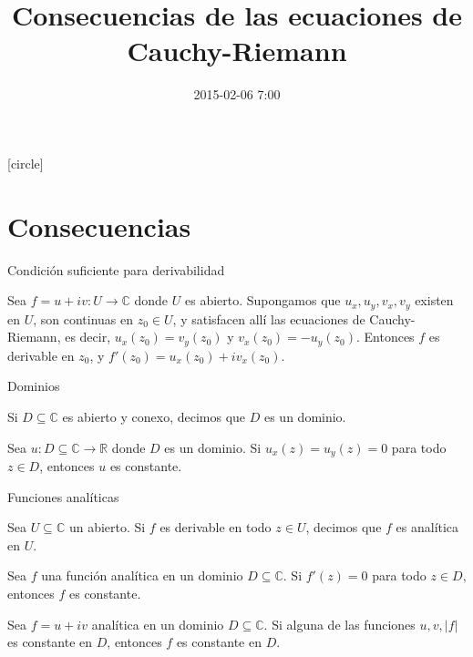 \documentclass[spanish,presentation]{beamer}
\date{2015-02-06 7:00}
\title{Consecuencias de las ecuaciones de Cauchy-Riemann}
\begin{document}
\maketitle
{}
[circle]

\tableofcontents

\section{Consecuencias}
\label{sec-1}

\begin{frame}[label=sec-1-1]{Condición suficiente para derivabilidad}
\begin{theorem}
Sea \(f=u+iv\colon U\to \mathbb{C}\) donde \(U\) es
abierto. Supongamos que \(u_{x},u_{y},v_{x},v_{y}\) existen en
\(U\), son continuas en \(z_{0}\in U\), y satisfacen allí las
ecuaciones de Cauchy-Riemann, es decir,
\(u_{x}(z_{0})=v_{y}(z_{0})\) y
\(v_{x}(z_{0})=-u_{y}(z_{0})\). Entonces \(f\) es derivable en
\(z_{0}\), y \(f'(z_{0})=u_{x}(z_{0})+iv_{x}(z_{0})\).
\end{theorem}
\end{frame}

\begin{frame}[label=sec-1-2]{Dominios}
\begin{definition}
Si \(D\subseteq \mathbb{C}\) es abierto y conexo, decimos que
\(D\) es un \alert{dominio}.
\end{definition}

\begin{lemma}
Sea \(u\colon D\subseteq \mathbb{C}\to \mathbb{R}\) donde \(D\) es
un dominio. Si \(u_{x}(z)=u_{y}(z)=0\) para todo \(z\in D\),
entonces \(u\) es constante.
\end{lemma}
\end{frame}

\begin{frame}[label=sec-1-3]{Funciones analíticas}
\begin{definition}
Sea \(U\subseteq \mathbb{C}\) un abierto. Si \(f\) es derivable en
todo \(z\in U\), decimos que \(f\) es \alert{analítica} en \(U\).
\end{definition}

\begin{theorem}
Sea \(f\) una función analítica en un dominio \(D\subseteq
    \mathbb{C}\). Si \(f'(z)=0\) para todo \(z\in D\), entonces \(f\)
es constante.
\end{theorem}

\begin{theorem}
Sea \(f=u+iv\) analítica en un dominio \(D\subseteq
    \mathbb{C}\). Si alguna de las funciones \(u,v,|f|\) es constante
en \(D\), entonces \(f\) es constante en \(D\).
\end{theorem}
\end{frame}
\end{document}
